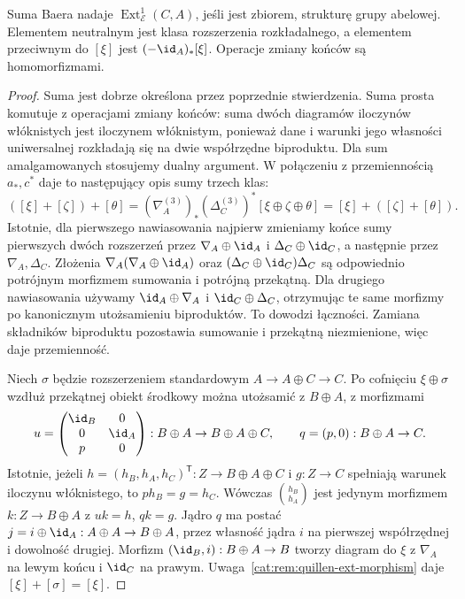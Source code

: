 \begin{twierdzenie}\label{cat:thm:quillen-baer-group}
Suma Baera nadaje $\operatorname{Ext}^1_{\mathscr E}(C,A)$, jeśli jest zbiorem, strukturę grupy abelowej. Elementem neutralnym jest klasa rozszerzenia rozkładalnego, a elementem przeciwnym do $[\xi]$ jest $(-\id_A)_*[\xi]$. Operacje zmiany końców są homomorfizmami.
\end{twierdzenie}
\begin{proof}
Suma jest dobrze określona przez poprzednie stwierdzenia. Suma prosta komutuje z operacjami zmiany końców: suma dwóch diagramów iloczynów włóknistych jest iloczynem włóknistym, ponieważ dane i warunki jego własności uniwersalnej rozkładają się na dwie współrzędne biproduktu. Dla sum amalgamowanych stosujemy dualny argument. W połączeniu z przemiennością $a_*,c^*$ daje to następujący opis sumy trzech klas:
\[
 ([\xi]+[\zeta])+[\theta]
 =(\nabla_A^{(3)})_*(\Delta_C^{(3)})^*
       [\xi\oplus\zeta\oplus\theta]
 =[\xi]+([\zeta]+[\theta]).
\]
Istotnie, dla pierwszego nawiasowania najpierw zmieniamy końce sumy pierwszych dwóch rozszerzeń przez $\nabla_A\oplus\id_A$ i $\Delta_C\oplus\id_C$, a następnie przez $\nabla_A,\Delta_C$. Złożenia $\nabla_A(\nabla_A\oplus\id_A)$ oraz $(\Delta_C\oplus\id_C)\Delta_C$ są odpowiednio potrójnym morfizmem sumowania i potrójną przekątną. Dla drugiego nawiasowania używamy $\id_A\oplus\nabla_A$ i $\id_C\oplus\Delta_C$, otrzymując te same morfizmy po kanonicznym utożsamieniu biproduktów. To dowodzi łączności. Zamiana składników biproduktu pozostawia sumowanie i przekątną niezmienione, więc daje przemienność.

Niech $\sigma$ będzie rozszerzeniem standardowym $A\to A\oplus C\to C$. Po cofnięciu $\xi\oplus\sigma$ wzdłuż przekątnej obiekt środkowy można utożsamić z $B\oplus A$, z morfizmami
\[
 u=\begin{pmatrix}\id_B&0\\0&\id_A\\p&0\end{pmatrix}
 :B\oplus A\to B\oplus A\oplus C,\qquad
 q=(p,0):B\oplus A\to C.
\]
Istotnie, jeżeli $h=(h_B,h_A,h_C)^{\mathsf T}:Z\to B\oplus A\oplus C$ i $g:Z\to C$ spełniają warunek iloczynu włóknistego, to $ph_B=g=h_C$. Wówczas $\binom{h_B}{h_A}$ jest jedynym morfizmem $k:Z\to B\oplus A$ z $uk=h$, $qk=g$. Jądro $q$ ma postać $j=i\oplus\id_A:A\oplus A\to B\oplus A$, przez własność jądra $i$ na pierwszej współrzędnej i dowolność drugiej. Morfizm $(\id_B,i):B\oplus A\to B$ tworzy diagram do $\xi$ z $\nabla_A$ na lewym końcu i $\id_C$ na prawym. Uwaga~\ref{cat:rem:quillen-ext-morphism} daje $[\xi]+[\sigma]=[\xi]$.


\end{proof}
